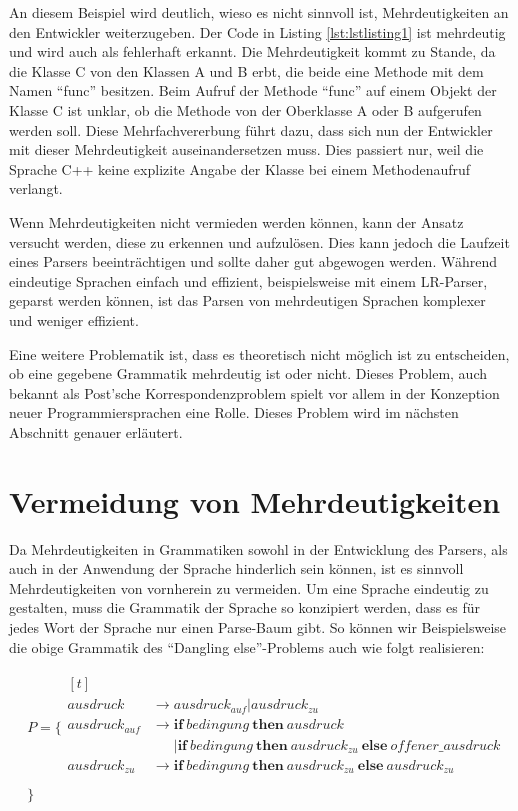 \documentclass[runningheads]{llncs}
\begin{document}
	An diesem Beispiel wird deutlich,
	wieso es nicht sinnvoll ist, Mehrdeutigkeiten an den Entwickler weiterzugeben.
	Der Code in Listing \ref{lst:lstlisting1} ist mehrdeutig und wird auch als fehlerhaft erkannt.
	Die Mehrdeutigkeit kommt zu Stande, da die Klasse C von den Klassen A und B erbt,
	die beide eine Methode mit dem Namen ``func'' besitzen.
	Beim Aufruf der Methode ``func'' auf einem Objekt der Klasse C ist unklar,
	ob die Methode von der Oberklasse A oder B aufgerufen werden soll.
	Diese Mehrfachvererbung führt dazu, dass sich nun der Entwickler mit dieser Mehrdeutigkeit auseinandersetzen muss.
	Dies passiert nur, weil die Sprache C++ keine explizite Angabe der Klasse bei einem Methodenaufruf verlangt.

	Wenn Mehrdeutigkeiten nicht vermieden werden können,
	kann der Ansatz versucht werden, diese zu erkennen und aufzulösen.
	Dies kann jedoch die Laufzeit eines Parsers beeinträchtigen und sollte daher gut abgewogen werden.
	Während eindeutige Sprachen einfach und effizient, beispielsweise mit einem LR-Parser, geparst werden können,
	ist das Parsen von mehrdeutigen Sprachen komplexer und weniger effizient.

	Eine weitere Problematik ist, dass es theoretisch nicht möglich ist zu entscheiden,
	ob eine gegebene Grammatik mehrdeutig ist oder nicht.
	Dieses Problem, auch bekannt als Post'sche Korrespondenzproblem
	spielt vor allem in der Konzeption neuer Programmiersprachen eine Rolle.
	Dieses Problem wird im nächsten Abschnitt genauer erläutert.


	\section{Vermeidung von Mehrdeutigkeiten}\label{sec:vermeidung-von-mehrdeutigkeiten}

	Da Mehrdeutigkeiten in Grammatiken sowohl in der Entwicklung des Parsers,
	als auch in der Anwendung der Sprache hinderlich sein können,
	ist es sinnvoll Mehrdeutigkeiten von vornherein zu vermeiden.
	Um eine Sprache eindeutig zu gestalten,
	muss die Grammatik der Sprache so konzipiert werden,
	dass es für jedes Wort der Sprache nur einen Parse-Baum gibt.
	So können wir Beispielsweise die obige Grammatik des ``Dangling else''-Problems auch wie folgt realisieren\cite{Abrahams1966}:

	\begin{align*}
		& P = \{ \begin{aligned}[t]
			         \\
			         ausdruck & \rightarrow ausdruck_{auf} | ausdruck_{zu} \\
			         ausdruck_{auf} & \rightarrow \textbf{if} \ bedingung \ \textbf{then} \ ausdruck \\
			         \phantom{A} & \phantom{\rightarrow} \vert \textbf{if} \ bedingung \ \textbf{then} \ ausdruck_{zu} \ \textbf{else} \ offener\_ausdruck \\
			         ausdruck_{zu} & \rightarrow \textbf{if} \ bedingung \ \textbf{then} \ ausdruck_{zu} \ \textbf{else} \ ausdruck_{zu} \\
		\end{aligned} \\
		& \}
	\end{align*}
\end{document}
